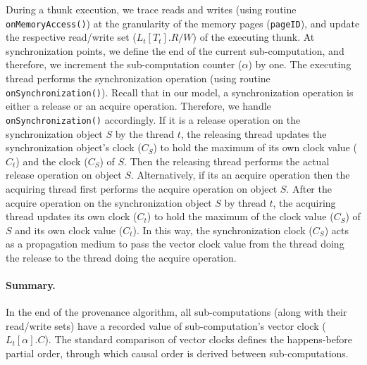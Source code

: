 During a thunk execution, we trace reads and writes  (using routine {\tt onMemoryAccess()}) at the granularity of the
memory pages ({\tt pageID}), and update the respective read/write set
($L_t[T_t].R/W$) of the executing thunk.  
At synchronization points, we define the end of the current sub-computation, and therefore, we increment the sub-computation  counter ($\alpha$) by one. The executing thread performs the synchronization operation (using routine {\tt onSynchronization()}). Recall that in our model, a synchronization operation is either a release or an acquire operation. Therefore, we handle {\tt onSynchronization()} accordingly. If it is a release operation on the synchronization object $S$ by the thread $t$, the 
releasing thread updates the synchronization object's clock ($C_S$) to
hold the maximum of its own clock value ($C_{t}$) and the clock  ($C_S$) of $S$. Then the releasing thread performs the actual release operation  on object $S$. Alternatively, if its an acquire operation then the acquiring thread first performs the acquire  operation on object $S$. After the acquire operation on the synchronization object $S$ by
thread $t$, the acquiring thread updates its own clock ($C_{t}$) to hold the
maximum of the clock value  ($C_S$) of $S$  and its own clock value ($C_{t}$).  
In this way, the synchronization clock ($C_S$) acts as a propagation medium to pass the
vector clock value from the thread doing the release to the thread doing the acquire operation. 



\paragraph{Summary.} In the end of the provenance algorithm, all sub-computations (along with their read/write sets) have a recorded value of sub-computation's vector clock ($L_t[\alpha].C$). The standard comparison of vector clocks defines the  happens-before partial order, through which causal order is derived between sub-computations.



